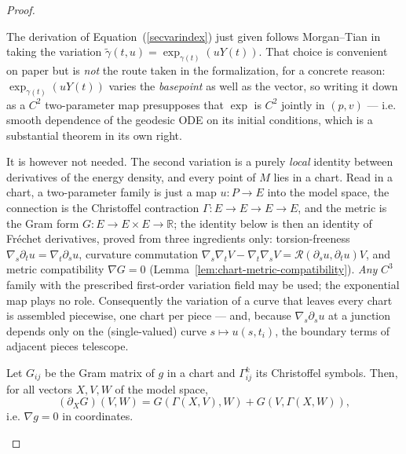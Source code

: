 \begin{proof}
\begin{remark}
\label{rem:second-variation-chart-route}
\leanok
The derivation of Equation~(\ref{secvarindex}) just given follows Morgan--Tian in
taking the variation $\tilde\gamma(t,u)=\exp_{\gamma(t)}(uY(t))$.  That choice is
convenient on paper but is \emph{not} the route taken in the formalization, for a
concrete reason: $\exp_{\gamma(t)}(uY(t))$ varies the \emph{basepoint} as well as
the vector, so writing it down as a $C^2$ two-parameter map presupposes that
$\exp$ is $C^2$ jointly in $(p,v)$ — i.e. smooth dependence of the geodesic ODE on
its initial conditions, which is a substantial theorem in its own right.

It is however not needed.  The second variation is a purely \emph{local} identity
between derivatives of the energy density, and every point of $M$ lies in a chart.
Read in a chart, a two-parameter family is just a map $u\colon P\to E$ into the
model space, the connection is the Christoffel contraction
$\Gamma\colon E\to E\to E\to E$, and the metric is the Gram form
$G\colon E\to E\times E\to\mathbb R$; the identity below is then an identity of
Fréchet derivatives, proved from three ingredients only: torsion-freeness
$\nabla_s\partial_t u=\nabla_t\partial_s u$, curvature commutation
$\nabla_s\nabla_t V-\nabla_t\nabla_s V={\mathcal R}(\partial_su,\partial_tu)V$, and
metric compatibility $\nabla G=0$ (Lemma~\ref{lem:chart-metric-compatibility}).
\emph{Any} $C^3$ family with the prescribed first-order variation field may be
used; the exponential map plays no role.  Consequently the variation of a curve
that leaves every chart is assembled piecewise, one chart per piece — and, because
$\nabla_s\partial_s u$ at a junction depends only on the (single-valued) curve
$s\mapsto u(s,t_i)$, the boundary terms of adjacent pieces telescope.
\end{remark}

\begin{lemma}
\label{lem:chart-metric-compatibility}
\leanok



Let $G_{ij}$ be the Gram matrix of $g$ in a chart and $\Gamma^k_{ij}$ its
Christoffel symbols.  Then, for all vectors $X,V,W$ of the model space,
$$(\partial_X G)(V,W)=G(\Gamma(X,V),W)+G(V,\Gamma(X,W)),$$
i.e. $\nabla g=0$ in coordinates.
\end{lemma}


\end{proof}
